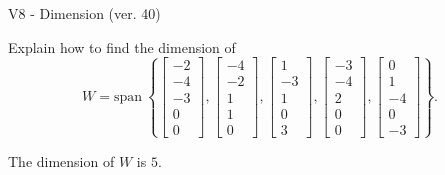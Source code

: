 \begin{exercise}
  \begin{exerciseTitle}V8 - Dimension (ver. 40)\end{exerciseTitle}
  \begin{exerciseStatement}
    Explain how to find the dimension of 
\[W=\mathrm{span}\ \left\{\left[\begin{array}{r}
-2 \\
-4 \\
-3 \\
0 \\
0
\end{array}\right] , \left[\begin{array}{r}
-4 \\
-2 \\
1 \\
1 \\
0
\end{array}\right] , \left[\begin{array}{r}
1 \\
-3 \\
1 \\
0 \\
3
\end{array}\right] , \left[\begin{array}{r}
-3 \\
-4 \\
2 \\
0 \\
0
\end{array}\right] , \left[\begin{array}{r}
0 \\
1 \\
-4 \\
0 \\
-3
\end{array}\right]\right\}.\]



  \end{exerciseStatement}
  \begin{exerciseAnswer}
   The dimension of \(W\) is  \(5\).
  


  \end{exerciseAnswer}
\end{exercise}